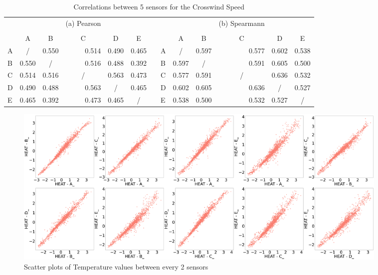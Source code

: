 \documentclass[a4paper]{article}
\begin{document}
\begin{table}[htbp]
  \centering
  \caption{Correlations between 5 sensors for the Crosswind Speed}
    \begin{tabular}{l|rrrrccl|rrrrc}
    \multicolumn{1}{c}{} &       &       & \multicolumn{1}{c}{(a) Pearson} &       &       &       & \multicolumn{1}{c}{} &       &       & \multicolumn{1}{c}{(b) Spearmann} &       &  \\
    \multicolumn{1}{c}{} &       &       &       &       &       &       & \multicolumn{1}{c}{} &       &       &       &       &  \\
          & \multicolumn{1}{c}{A} & \multicolumn{1}{c}{B} & \multicolumn{1}{c}{C} & \multicolumn{1}{c}{D} & E     &       &       & \multicolumn{1}{c}{A} & \multicolumn{1}{c}{B} & \multicolumn{1}{c}{C} & \multicolumn{1}{c}{D} & E \\
\cmidrule{1-6}\cmidrule{8-13}    A     & \multicolumn{1}{c}{/} & 0.550  & 0.514  & 0.490  & \multicolumn{1}{r}{0.465 } &       & A     & \multicolumn{1}{c}{/} & 0.597  & 0.577  & 0.602  & \multicolumn{1}{r}{0.538 } \\
    B     & 0.550  & \multicolumn{1}{c}{/} & 0.516  & 0.488  & \multicolumn{1}{r}{0.392 } &       & B     & 0.597  & \multicolumn{1}{c}{/} & 0.591  & 0.605  & \multicolumn{1}{r}{0.500 } \\
    C     & 0.514  & 0.516  & \multicolumn{1}{c}{/} & 0.563  & \multicolumn{1}{r}{0.473 } &       & C     & 0.577  & 0.591  & \multicolumn{1}{c}{/} & 0.636  & \multicolumn{1}{r}{0.532 } \\
    D     & 0.490  & 0.488  & 0.563  & \multicolumn{1}{c}{/} & \multicolumn{1}{r}{0.465 } &       & D     & 0.602  & 0.605  & 0.636  & \multicolumn{1}{c}{/} & \multicolumn{1}{r}{0.527 } \\
    E     & 0.465  & 0.392  & 0.473  & 0.465  & /     &       & E     & 0.538  & 0.500  & 0.532  & 0.527  & / \\
    \end{tabular}%
\end{table}%

\begin{figure}[htbp]
\centering
\includegraphics[width=0.9\textwidth]{images/scatter_temp.png} 
\caption{Scatter plots of Temperature values between every 2 sensors}
\end{figure}
\end{document}

